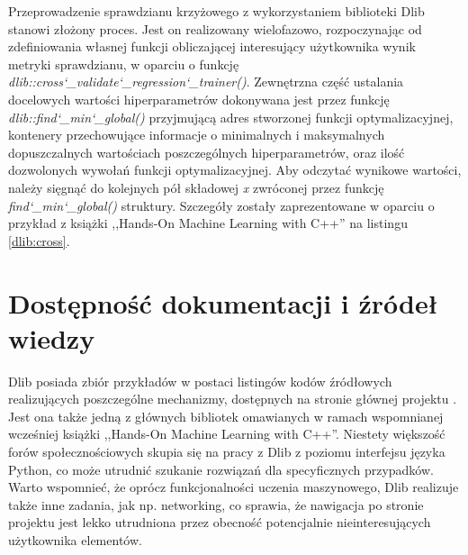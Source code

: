 Przeprowadzenie sprawdzianu krzyżowego z wykorzystaniem biblioteki Dlib stanowi złożony proces. Jest on realizowany wielofazowo, rozpoczynając od zdefiniowania własnej funkcji obliczającej interesujący użytkownika wynik metryki sprawdzianu, w oparciu o funkcję \textit{dlib::cross\char`_validate\char`_regression\char`_trainer()}. Zewnętrzna część ustalania docelowych wartości hiperparametrów dokonywana jest przez funkcję \textit{dlib::find\char`_min\char`_global()} przyjmującą adres stworzonej funkcji optymalizacyjnej, kontenery przechowujące informacje o minimalnych i maksymalnych dopuszczalnych wartościach poszczególnych hiperparametrów, oraz ilość dozwolonych wywołań funkcji optymalizacyjnej. Aby odczytać wynikowe wartości, należy sięgnąć do kolejnych pół składowej \textit{x} zwróconej przez funkcję \textit{find\char`_min\char`_global()} struktury. Szczegóły zostały zaprezentowane w oparciu o przykład z książki ,,Hands-On Machine Learning with C++'' \cite{handsOnMachineLearning} na listingu \ref{dlib:cross}.


\section{Dostępność dokumentacji i źródeł wiedzy}

Dlib posiada zbiór przykładów w postaci listingów kodów źródłowych realizujących poszczególne mechanizmy, dostępnych na stronie głównej projektu \cite{dlib:home}. Jest ona także jedną z głównych bibliotek omawianych w ramach wspomnianej wcześniej książki ,,Hands-On Machine Learning with C++''. Niestety większość forów społecznościowych skupia się na pracy z Dlib z poziomu interfejsu języka Python, co może utrudnić szukanie rozwiązań dla specyficznych przypadków. Warto wspomnieć, że oprócz funkcjonalności uczenia maszynowego, Dlib realizuje także inne zadania, jak np. networking, co sprawia, że nawigacja po stronie projektu jest lekko utrudniona przez obecność potencjalnie nieinteresujących użytkownika elementów.